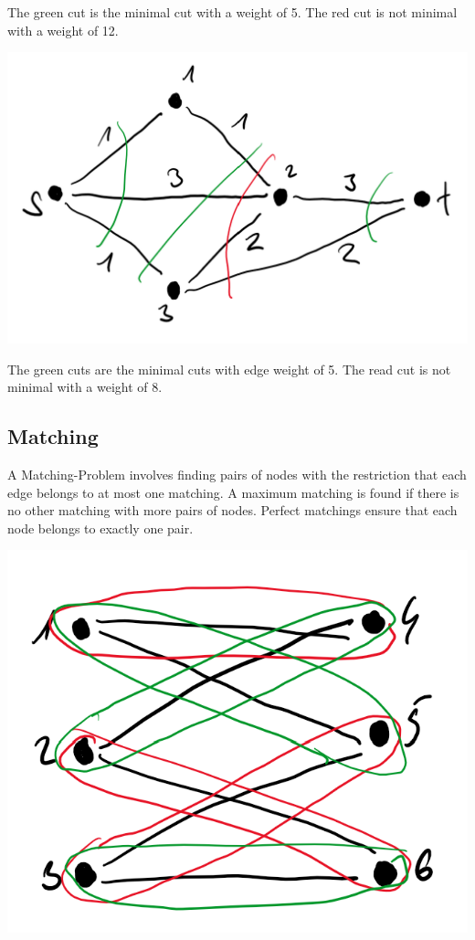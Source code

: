 \documentclass[runningheads]{llncs}
\begin{document}
The green cut is the minimal cut with a weight of 5. The red cut is not minimal with a weight of 12.

\includegraphics[scale=0.5]{./resources/graph_2}

The green cuts are the minimal cuts with edge weight of 5. The read cut is not minimal with a weight of 8.

\subsection*{Matching}
A Matching-Problem involves finding pairs of nodes with the restriction that each edge belongs to at most one matching. A maximum matching is found if there is no other matching with more pairs of nodes. Perfect matchings ensure that each node belongs to exactly one pair.

\includegraphics[scale=0.5]{./resources/graph_3}
\end{document}
